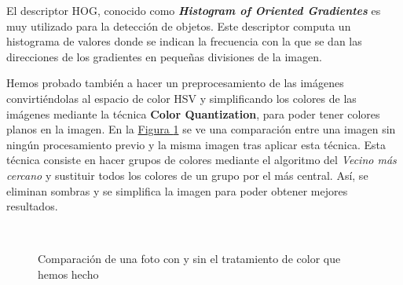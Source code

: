 \documentclass[paper=a4, fontsize=11pt]{article} %
\numberwithin{equation}{section} %
\numberwithin{figure}{section} %
\numberwithin{table}{section} %
\begin{document}
El descriptor HOG, conocido como \textit{\textbf{Histogram of Oriented Gradientes}} es muy utilizado para la detección de objetos. Este descriptor computa un histograma de valores donde se indican la frecuencia con la que se dan las direcciones de los gradientes en pequeñas divisiones de la imagen.

Hemos probado también a hacer un preprocesamiento de las imágenes convirtiéndolas al espacio de color HSV y simplificando los colores de las imágenes mediante la técnica \textbf{Color Quantization}\cite{cq}, para poder tener colores planos en la imagen. En la \hyperref[color]{Figura \ref*{color}} se ve una comparación entre una imagen sin ningún procesamiento previo y la misma imagen tras aplicar esta técnica. Esta técnica consiste en hacer grupos de colores mediante el algoritmo del \textit{Vecino más cercano} y sustituir todos los colores de un grupo por el más central. Así, se eliminan sombras y se simplifica la imagen para poder obtener mejores resultados.

\begin{figure}[!h]
  \centering
  \mbox{
  }
  \caption{Comparación de una foto con y sin el tratamiento de color que hemos hecho}
  \label{color}
\end{figure}
\end{document}
